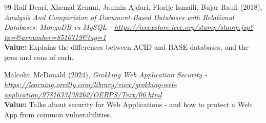 \documentclass[]{final_report}
\begin{document}
\begin{thebibliography}{99}
 Raif Deari, Xhemal Zenuni, Jaumin Ajdari, Florije Ismaili, Bujar Raufi (2018),
\emph{Analysis And Comparision of Document-Based Databases with Relational Databases: MongoDB vs MySQL - \url{https://ieeexplore.ieee.org/stamp/stamp.jsp?tp=&arnumber=8510719&tag=1}}\\
\textbf{Value:} Explains the differences between ACID and BASE databases, and the pros and cons of each.

 Malcolm McDonald (2024),
\emph{Grokking Web Application Security - \url{https://learning.oreilly.com/library/view/grokking-web-application/9781633438262/OEBPS/Text/06.html}}\\
\textbf{Value:} Talks about security for Web Applications - and how to protect a Web App from common vulnerabilities.
\end{thebibliography}
\label{endpage}
\end{document}
